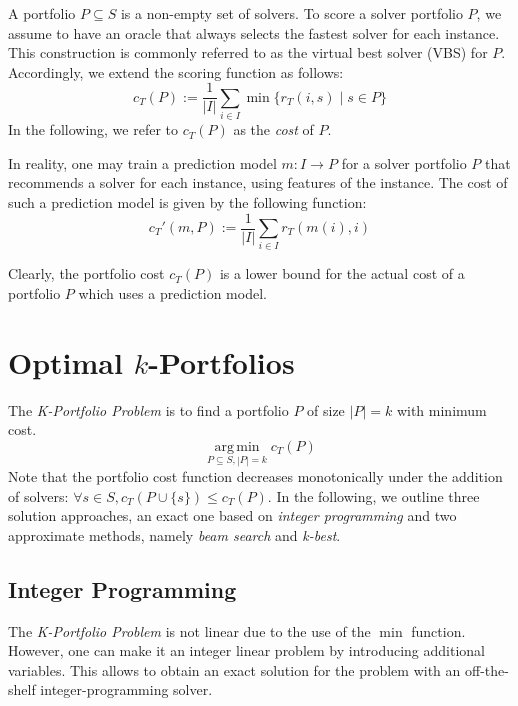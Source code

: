 \documentclass[conference]{IEEEtran}
\DeclareMathOperator*{\argmin}{arg\,min}
\begin{document}
A portfolio $P \subseteq S$ is a non-empty set of solvers.
To score a solver portfolio $P$, we assume to have an oracle that always selects the fastest solver for each instance. 
This construction is commonly referred to as the virtual best solver (VBS) for $P$. 
Accordingly, we extend the scoring function as follows:%
$$
	c_{T}(P) := \frac{1}{|I|} \sum\limits_{i \in I}{\min\{r_T(i,s) \mid s \in P\}}
$$
In the following, we refer to $c_{T}(P)$ as the \emph{cost} of $P$. 

In reality, one may train a prediction model $m : I \rightarrow P$ for a solver portfolio $P$ that recommends a solver for each instance, using features of the instance. 
The cost of such a prediction model is given by the following function:%
$$
	c_{T}'(m,P) := \frac{1}{|I|} \sum\limits_{i \in I}{r_T(m(i),i)}
$$

Clearly, the portfolio cost $c_{T}(P)$ is a lower bound for the actual cost of a portfolio $P$ which uses a prediction model.

\section{Optimal \texorpdfstring{$k$}{k}-Portfolios} %
\label{sec:approach}

The \emph{K-Portfolio Problem} is to find a portfolio $P$ of size $|P| = k$ with minimum cost.%
$$
\argmin\limits_{P \subseteq S, |P| = k} c_{T}(P)
$$
Note that the portfolio cost function decreases monotonically under the addition of solvers: $\forall s \in S, c_{T}(P \cup \{s\}) \leq c_{T}(P)$. 
In the following, we outline three solution approaches, an exact one based on \emph{integer programming} and two approximate methods, namely \emph{beam search} and \emph{k-best}. 

\subsection{Integer Programming}
\label{sec:approach:ip}

The \emph{K-Portfolio Problem} is not linear due to the use of the $\min$ function.
However, one can make it an integer linear problem by introducing additional variables.
This allows to obtain an exact solution for the problem with an off-the-shelf integer-programming solver.
\end{document}
